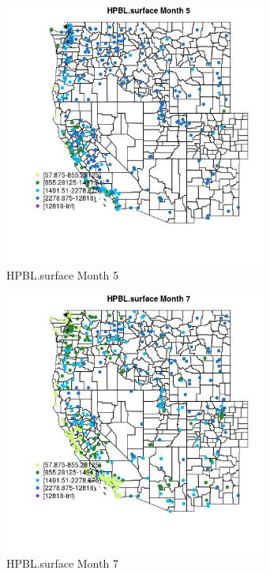 \begin{figure} 
\centering  
\includegraphics[width=0.77\textwidth]{Code_Outputs/Report_ML_input_PM25_Step4_part_e_de_duplicated_aves_compiled_2019-05-18wNAs_MapObsMo5HPBLsurface.jpg} 
\caption{\label{fig:Report_ML_input_PM25_Step4_part_e_de_duplicated_aves_compiled_2019-05-18wNAsMapObsMo5HPBLsurface}HPBL.surface Month 5} 
\end{figure} 
 

\begin{figure} 
\centering  
\includegraphics[width=0.77\textwidth]{Code_Outputs/Report_ML_input_PM25_Step4_part_e_de_duplicated_aves_compiled_2019-05-18wNAs_MapObsMo7HPBLsurface.jpg} 
\caption{\label{fig:Report_ML_input_PM25_Step4_part_e_de_duplicated_aves_compiled_2019-05-18wNAsMapObsMo7HPBLsurface}HPBL.surface Month 7} 
\end{figure} 
 

